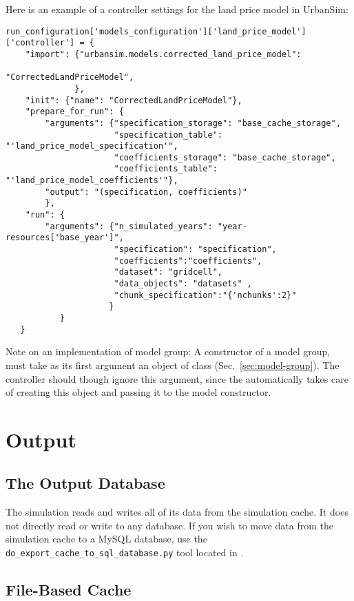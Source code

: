 Here is an example of a controller settings for the land price model in UrbanSim:
\modelsindex 
\begin{verbatim}
run_configuration['models_configuration']['land_price_model']['controller'] = {
    "import": {"urbansim.models.corrected_land_price_model":
                                                "CorrectedLandPriceModel",
              },
    "init": {"name": "CorrectedLandPriceModel"},
    "prepare_for_run": {
        "arguments": {"specification_storage": "base_cache_storage",
                      "specification_table": "'land_price_model_specification'",
                      "coefficients_storage": "base_cache_storage",
                      "coefficients_table": "'land_price_model_coefficients'"},
        "output": "(specification, coefficients)"
        },
    "run": {
        "arguments": {"n_simulated_years": "year-resources['base_year']",
                      "specification": "specification",
                      "coefficients":"coefficients",
                      "dataset": "gridcell",
                      "data_objects": "datasets" ,
                      "chunk_specification":"{'nchunks':2}"
                     }
           }
   }
\end{verbatim}
Note on an implementation of model group: A constructor of 
a model group, must take as its first argument an object of class  (Sec.~\ref{sec:model-group}). 
The controller should though ignore this argument, since the  automatically takes care of creating this object 
and passing it to the model constructor.

\section{Output}
%
\subsection{The Output Database}

The simulation reads and writes all of its data from the simulation cache.  It 
does not directly read or write to any database. 
If you wish to move data from the simulation cache to a MySQL database, use the
\verb|do_export_cache_to_sql_database.py| tool located in
. 

\subsection{File-Based
Cache}\label{cache}\simulationcacheindex

